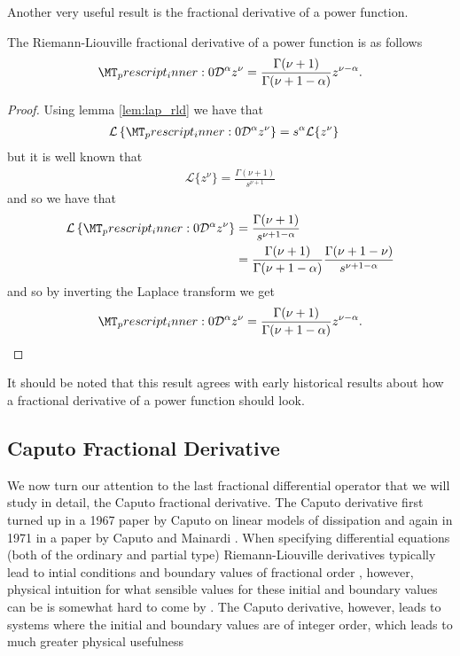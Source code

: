 Another very useful result is the fractional derivative of a power function. 
\begin{mdframed}[innertopmargin=10pt]
    \begin{lemma}
        \label{lem:rld_power}
        The Riemann-Liouville fractional derivative of a power function is as follows
        \begin{align}
            \prescript{}{0}{\mathcal{D}}^\alpha z^{\nu} = \frac{\Gamma(\nu+1)}{\Gamma(\nu + 1 -\alpha)} z^{\nu - \alpha}.
        \end{align}
    \end{lemma}
\end{mdframed}
\begin{proof}
    Using lemma \ref{lem:lap_rld} we have that
    \begin{align}
        \mathcal{L}\left\{ \prescript{}{0}{\mathcal{D}}^\alpha z^{\nu} \right\} &= s^\alpha \mathcal{L}\{ z^\nu \}
    \end{align}
    but it is well known that
    \begin{align}
        \mathcal{L}\{ z^\nu \} = \frac{\Gamma(\nu + 1)}{s^{\nu + 1}}
    \end{align}
    and so we have that
    \begin{align}
        \mathcal{L}\left\{ \prescript{}{0}{\mathcal{D}}^\alpha z^{\nu} \right\} &= \frac{\Gamma(\nu+1)}{s^{\nu + 1 - \alpha}} \\
            &= \frac{\Gamma(\nu+1)}{\Gamma(\nu + 1 - \alpha)} \frac{\Gamma(\nu + 1 - \nu)}{s^{\nu + 1 - \alpha}}
    \end{align}
    and so by inverting the Laplace transform we get
    \begin{align}
        \prescript{}{0}{\mathcal{D}}^\alpha z^{\nu}  = \frac{\Gamma(\nu + 1)}{\Gamma(\nu+1-\alpha)}z^{\nu - \alpha}.
    \end{align}
\end{proof}
It should be noted that this result agrees with early historical results about how a fractional derivative of a power function should look.

\subsection{Caputo Fractional Derivative}
\label{subsec:caputo}
We now turn our attention to the last fractional differential operator that we will study in detail, the Caputo fractional derivative. 
The Caputo derivative first turned up in a 1967 paper by Caputo on linear models of dissipation \cite{Caputo1967} and again in 1971 in a paper by Caputo and Mainardi \cite{Caputo1971}.  When specifying differential equations (both of the ordinary and partial type) Riemann-Liouville derivatives typically lead to intial conditions and boundary values of fractional order \cite{Caputo1971, Podlubny1999, Samko1993, Heymans2005}, however, physical intuition for what sensible values for these initial and boundary values can be is somewhat hard to come by \cite{Caputo1971, Podlubny1999, Samko1993, Gorenflo1997}. The Caputo derivative, however, leads to systems where the initial and boundary values are of integer order, which leads to much greater physical usefulness \cite{Podlubny1999, Samko1993, Gorenflo1997}

